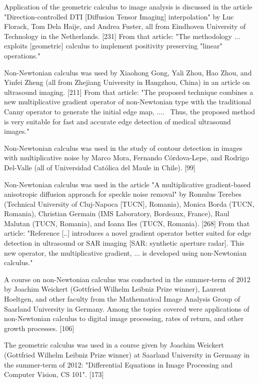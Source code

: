 \documentclass[12pt]{article}
\begin{document}
Application of the geometric calculus to image analysis is discussed in the article "Direction-controlled DTI [Diffusion Tensor Imaging] interpolation" by Luc Florack, Tom Dela Haije, and Andrea Fuster, all from Eindhoven University of Technology in the Netherlands. [231] From that article: "The methodology ... exploits [geometric] calculus to implement positivity preserving "linear" operations."

Non-Newtonian calculus was used by Xiaohong Gong, Yali Zhou, Hao Zhou, and Yinfei Zheng (all from Zhejiang University in Hangzhou, China) in an article on ultrasound imaging. [211] From that article: "The proposed technique combines a new multiplicative gradient operator of non-Newtonian type with the traditional Canny operator to generate the initial edge map, ....  Thus, the proposed method is very suitable for fast and accurate edge detection of medical ultrasound images."

Non-Newtonian calculus was used in the study of contour detection in images with multiplicative noise by Marco Mora, Fernando Córdova-Lepe, and Rodrigo Del-Valle (all of Universidad Católica del Maule in Chile). [99] 

Non-Newtonian calculus was used in the article "A multiplicative gradient-based anisotropic diffusion approach for speckle noise removal" by Romulus Terebes (Technical University of Cluj-Napoca [TUCN], Romania), Monica Borda (TUCN, Romania), Christian Germain (IMS Laboratory, Bordeaux, France), Raul Malutan (TUCN, Romania), and Ioana Iles (TUCN, Romania). [268] From that article: "Reference [..] introduces a novel gradient operator better suited for edge detection in ultrasound or SAR imaging [SAR: synthetic aperture radar]. This new operator, the multiplicative gradient, ... is developed using non-Newtonian calculus."

A course on non-Newtonian calculus was conducted in the summer-term of 2012 by Joachim Weickert (Gottfried Wilhelm Leibniz Prize winner), Laurent Hoeltgen, and other faculty from the Mathematical Image Analysis Group of Saarland University in Germany. Among the topics covered were applications of non-Newtonian calculus to digital image processing, rates of return, and other growth processes. [106]

The geometric calculus was used in a course given by Joachim Weickert (Gottfried Wilhelm Leibniz Prize winner) at Saarland University in Germany in the summer-term of 2012: "Differential Equations in Image Processing and Computer Vision, CS 101". [173]
\end{document}
